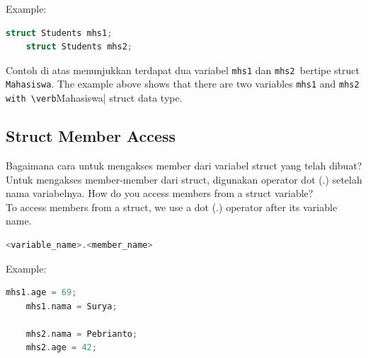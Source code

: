 Example:
\begin{lstlisting}[language=c]
    struct Students mhs1;
    struct Students mhs2;
\end{lstlisting}
Contoh di atas menunjukkan terdapat dua variabel \verb|mhs1| dan \verb|mhs2 |bertipe struct \verb|Mahasiswa|.
The example above shows that there are two variables \verb|mhs1| and \verb|mhs2 with \verb|Mahasiswa| struct data type.

\subsection{Struct Member Access}
Bagaimana cara untuk mengakses member dari variabel struct yang telah dibuat? \\
Untuk mengakses member-member dari struct, digunakan operator dot (.) setelah nama variabelnya.
How do you access members from a struct variable? \\
To access members from a struct, we use a dot (.) operator after its variable name.

\begin{lstlisting}[language=c]
    <variable_name>.<member_name>
\end{lstlisting}

Example:
\begin{lstlisting}[language=c]
    mhs1.age = 69;
    mhs1.nama = Surya;
    
    mhs2.nama = Pebrianto;
    mhs2.age = 42;
\end{lstlisting}

